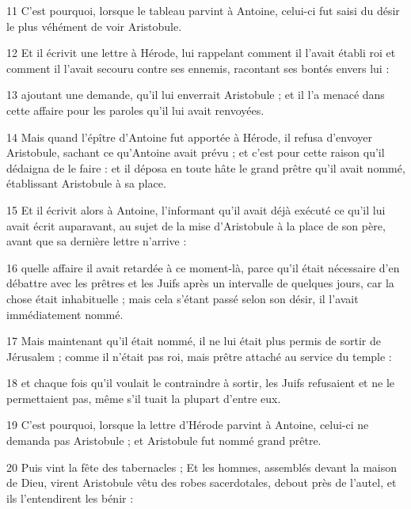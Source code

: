 \par 11 C'est pourquoi, lorsque le tableau parvint à Antoine, celui-ci fut saisi du désir le plus véhément de voir Aristobule.

\par 12 Et il écrivit une lettre à Hérode, lui rappelant comment il l'avait établi roi et comment il l'avait secouru contre ses ennemis, racontant ses bontés envers lui :

\par 13 ajoutant une demande, qu'il lui enverrait Aristobule ; et il l'a menacé dans cette affaire pour les paroles qu'il lui avait renvoyées.

\par 14 Mais quand l'épître d'Antoine fut apportée à Hérode, il refusa d'envoyer Aristobule, sachant ce qu'Antoine avait prévu ; et c'est pour cette raison qu'il dédaigna de le faire : et il déposa en toute hâte le grand prêtre qu'il avait nommé, établissant Aristobule à sa place.

\par 15 Et il écrivit alors à Antoine, l'informant qu'il avait déjà exécuté ce qu'il lui avait écrit auparavant, au sujet de la mise d'Aristobule à la place de son père, avant que sa dernière lettre n'arrive :

\par 16 quelle affaire il avait retardée à ce moment-là, parce qu'il était nécessaire d'en débattre avec les prêtres et les Juifs après un intervalle de quelques jours, car la chose était inhabituelle ; mais cela s'étant passé selon son désir, il l'avait immédiatement nommé.

\par 17 Mais maintenant qu'il était nommé, il ne lui était plus permis de sortir de Jérusalem ; comme il n'était pas roi, mais prêtre attaché au service du temple :

\par 18 et chaque fois qu'il voulait le contraindre à sortir, les Juifs refusaient et ne le permettaient pas, même s'il tuait la plupart d'entre eux.

\par 19 C'est pourquoi, lorsque la lettre d'Hérode parvint à Antoine, celui-ci ne demanda pas Aristobule ; et Aristobule fut nommé grand prêtre.

\par 20 Puis vint la fête des tabernacles ; Et les hommes, assemblés devant la maison de Dieu, virent Aristobule vêtu des robes sacerdotales, debout près de l'autel, et ils l'entendirent les bénir :

